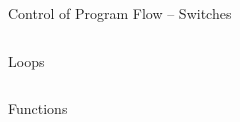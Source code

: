 \documentclass[10pt]{beamer}
\begin{document}
\begin{frame}{Control of Program Flow -- Switches}
\begin{columns}[c]
  \begin{column}{0.5\textwidth}
    
  \end{column}
  \begin{column}{0.5\textwidth}
    
  \end{column}
\end{columns}
\end{frame}

\begin{frame}{Loops}
\begin{columns}[c]
  \begin{column}{0.5\textwidth}
    
  \end{column}
  \begin{column}{0.5\textwidth}
    
  \end{column}
\end{columns}
\end{frame}

\begin{frame}{Functions}
\begin{columns}[c]
  \begin{column}{0.5\textwidth}
    
  \end{column}
  \begin{column}{0.5\textwidth}
    
  \end{column}
\end{columns}
\end{frame}
\end{document}
